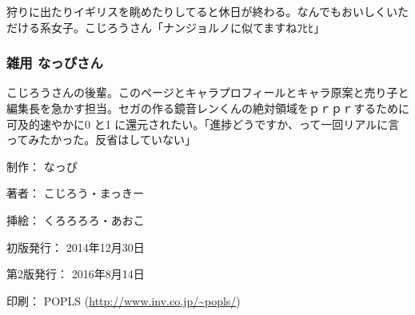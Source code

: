 \documentclass[9pt,b5paper,tombo,openany,dvipdfmx]{jsbook}
\begin{document}
\begin{flushleft}
\begin{minipage}{0.5\hsize}
\begin{scriptsize}
			狩りに出たりイギリスを眺めたりしてると休日が終わる。なんでもおいしくいただける系女子。こじろうさん「ナンジョルノに似てますねﾌﾋﾋ」

			\subsubsection*{雑用 なっぴさん}

			こじろうさんの後輩。このページとキャラプロフィールとキャラ原案と売り子と編集長を急かす担当。セガの作る鏡音レンくんの絶対領域をｐｒｐｒするために可及的速やかに0 と1 に還元されたい。「進捗どうですか、って一回リアルに言ってみたかった。反省はしていない」

		\end{scriptsize}
	\end{minipage}
\end{flushleft}

\begin{flushright}
	\begin{minipage}{0.5\hsize}
		\begin{small}
			\begin{description}
				\item{制作：} なっぴ
				\item{著者：} こじろう・まっきー
				\item{挿絵：} くろろろろ・あおこ
				\item{初版発行：} 2014年12月30日
				\item{第2版発行：} 2016年8月14日
				\item{印刷：} POPLS (\url{http://www.inv.co.jp/~popls/})
			\end{description}
		\end{small}
	\end{minipage}
\end{flushright}


\end{document}
